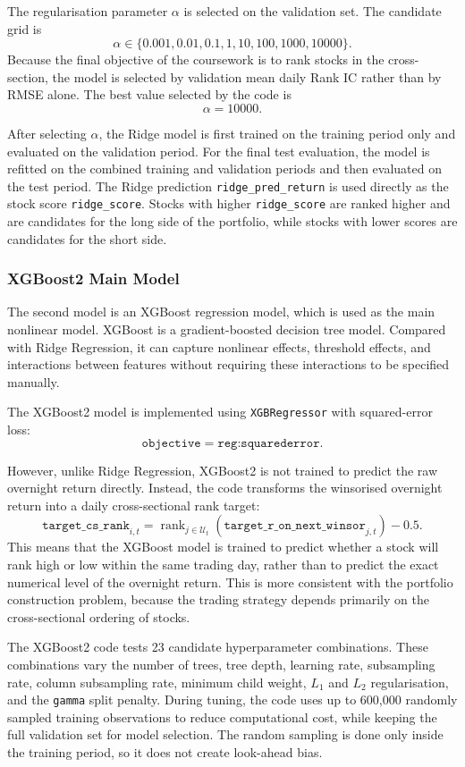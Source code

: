 \documentclass[12pt]{article}
\begin{document}
The regularisation parameter $\alpha$ is selected on the validation set. The candidate grid is
\[
\alpha \in 
\{0.001, 0.01, 0.1, 1, 10, 100, 1000, 10000\}.
\]
Because the final objective of the coursework is to rank stocks in the cross-section, the model is selected by validation mean daily Rank IC rather than by RMSE alone. The best value selected by the code is
\[
\alpha = 10000.
\]

After selecting $\alpha$, the Ridge model is first trained on the training period only and evaluated on the validation period. For the final test evaluation, the model is refitted on the combined training and validation periods and then evaluated on the test period. The Ridge prediction \texttt{ridge\_pred\_return} is used directly as the stock score \texttt{ridge\_score}. Stocks with higher \texttt{ridge\_score} are ranked higher and are candidates for the long side of the portfolio, while stocks with lower scores are candidates for the short side.

\subsubsection{XGBoost2 Main Model}

The second model is an XGBoost regression model, which is used as the main nonlinear model. XGBoost is a gradient-boosted decision tree model. Compared with Ridge Regression, it can capture nonlinear effects, threshold effects, and interactions between features without requiring these interactions to be specified manually.

The XGBoost2 model is implemented using \texttt{XGBRegressor} with squared-error loss:
\[
\texttt{objective}=\texttt{reg:squarederror}.
\]

However, unlike Ridge Regression, XGBoost2 is not trained to predict the raw overnight return directly. Instead, the code transforms the winsorised overnight return into a daily cross-sectional rank target:
\[
\texttt{target\_cs\_rank}_{i,t}
=
\operatorname{rank}_{j\in\mathcal{U}_t}
\left(
\texttt{target\_r\_on\_next\_winsor}_{j,t}
\right)
-0.5.
\]
This means that the XGBoost model is trained to predict whether a stock will rank high or low within the same trading day, rather than to predict the exact numerical level of the overnight return. This is more consistent with the portfolio construction problem, because the trading strategy depends primarily on the cross-sectional ordering of stocks.

The XGBoost2 code tests 23 candidate hyperparameter combinations. These combinations vary the number of trees, tree depth, learning rate, subsampling rate, column subsampling rate, minimum child weight, $L_1$ and $L_2$ regularisation, and the \texttt{gamma} split penalty. During tuning, the code uses up to 600,000 randomly sampled training observations to reduce computational cost, while keeping the full validation set for model selection. The random sampling is done only inside the training period, so it does not create look-ahead bias.
\end{document}
